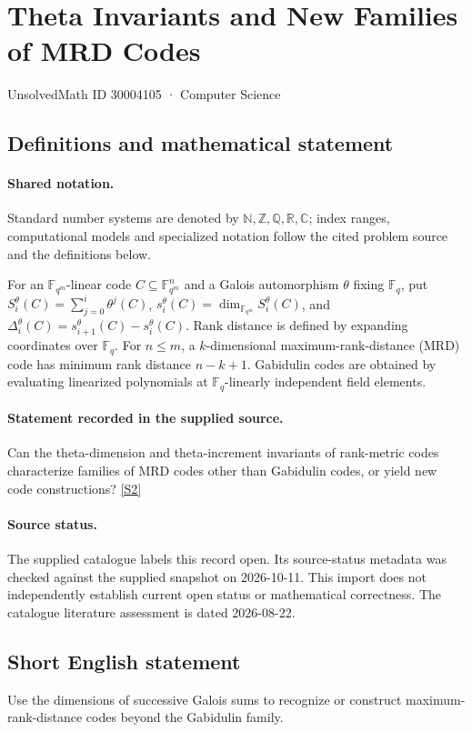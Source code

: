 \documentclass[11pt]{article}
\newcommand{\sref}[2]{\hyperlink{source:#1:#2}{[S#2]}}
\begin{document}
\setcounter{section}{30004104}
\section{Theta Invariants and New Families of MRD Codes}\label{30004105}
{\small\sffamily UnsolvedMath ID 30004105 · Computer Science}
\subsection{Definitions and mathematical statement}

\paragraph{Shared notation.}Standard number systems are denoted by $\mathbb N,\mathbb Z,\mathbb Q,\mathbb R,\mathbb C$; index ranges, computational models and specialized notation follow the cited problem source and the definitions below.


For an $\mathbb F_{q^m}$-linear code $C\subseteq\mathbb F_{q^m}^{n}$ and a Galois automorphism $\theta$ fixing $\mathbb F_q$, put $S_i^\theta(C)=\sum_{j=0}^{i}\theta^j(C)$, $s_i^\theta(C)=\dim_{\mathbb F_{q^m}}S_i^\theta(C)$, and $\Delta_i^\theta(C)=s_{i+1}^\theta(C)-s_i^\theta(C)$. Rank distance is defined by expanding coordinates over $\mathbb F_q$. For $n\leq m$, a $k$-dimensional maximum-rank-distance (MRD) code has minimum rank distance $n-k+1$. Gabidulin codes are obtained by evaluating linearized polynomials at $\mathbb F_q$-linearly independent field elements.
\paragraph{Statement recorded in the supplied source.}
Can the theta-dimension and theta-increment invariants of rank-metric codes characterize families of MRD codes other than Gabidulin codes, or yield new code constructions? \sref{30004105}{2}
\paragraph{Source status.}
The supplied catalogue labels this record open. Its source-status metadata was checked against the supplied snapshot on 2026-10-11. This import does not independently establish current open status or mathematical correctness. The catalogue literature assessment is dated 2026-08-22.
\subsection{Short English statement}
Use the dimensions of successive Galois sums to recognize or construct maximum-rank-distance codes beyond the Gabidulin family.
\end{document}
